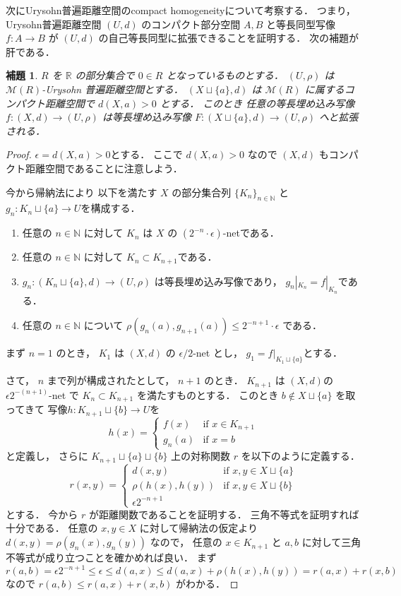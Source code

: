 \documentclass[leqno, 12pt]{jsarticle}
\newtheorem{lem}[thm]{補題}
\newcommand{\nn}{\mathbb{N}}
\newcommand{\rr}{\mathbb{R}}
\begin{document}
次にUrysohn普遍距離空間のcompact homogeneityについて考察する．
つまり，Urysohn普遍距離空間
$(U, d)$
のコンパクト部分空間
$A, B$
と等長同型写像
$f\colon  A\to B$
が
$(U, d)$
の自己等長同型に拡張できることを証明する．
次の補題が肝である．
\begin{lem}\label{lem:pp:cpthom}
$R$
を
$\rr$
の部分集合で
$0\in R$
となっているものとする．
$(U, \rho)$
は
$\mathscr{M}(R)$-Urysohn
普遍距離空間とする．
$(X\sqcup\{a\}, d)$
は
$\mathscr{M}(R)$
に属するコンパクト距離空間で
$d(X, a)>0$
とする．
このとき
任意の等長埋め込み写像
$f\colon  (X, d)\to(U, \rho)$
は等長埋め込み写像
$F\colon  (X\sqcup \{a\}, d)\to (U, \rho)$
へと拡張される．
\end{lem}
\begin{proof}
$\epsilon =d(X, a)>0$とする．
ここで
$d(X, a)>0$
なので
$(X, d)$
もコンパクト距離空間であることに注意しよう．




今から帰納法により
以下を満たす
$X$
の部分集合列
$\{K_{n}\}_{n\in \nn}$
と
$g_{n}\colon  K_{n}\sqcup\{a\}\to U$を構成する．
\begin{enumerate}
\item 
任意の
$n\in \nn$
に対して
$K_{n}$
は
$X$
の
$(2^{-n}\cdot\epsilon)$-netである．
\item 
任意の
$n\in \nn$
に対して
$K_{n}\subset K_{n+1}$である．
\item 
$g_{n}\colon  (K_{n}\sqcup\{a\}, d)\to (U, \rho)$
は等長埋め込み写像であり，
$g_{n}|_{K_n}=f|_{K_{n}}$である．
\item 
任意の
$n\in \nn$
について
$\rho(g_{n}(a), g_{n+1}(a))\le 2^{-n+1}\cdot \epsilon$
である．
\end{enumerate}
まず
$n=1$
のとき，
$K_{1}$
は
$(X, d)$
の
$\epsilon/2$-net
とし，
$g_{1}=f|_{K_{1}\sqcup\{a\}}$とする．

さて，
$n$
まで列が構成されたとして，
$n+1$
のとき．
$K_{n+1}$
は
$(X, d)$の
$\epsilon 2^{-(n+1)}$-net
で
$K_{n}\subset K_{n+1}$
を満たすものとする．
このとき
$b\not\in X\sqcup\{a\}$
を取ってきて
写像$h\colon  K_{n+1}\sqcup\{b\}\to U$を
\[
h(x)=
\begin{cases}
f(x) & \text{if $x\in K_{n+1}$}\\
g_{n}(a) & \text{if $x=b$}
\end{cases}
\]
と定義し，
さらに
$K_{n+1}\sqcup\{a\}\sqcup\{b\}$
上の対称関数
$r$
を以下のように定義する．
\[
r(x, y)=
\begin{cases}
	d(x, y) & \text{if $x, y\in X\sqcup\{a\}$}\\
	\rho(h(x), h(y)) & \text{if $x, y\in X\sqcup\{b\}$}\\
	\epsilon 2^{-n+1}
\end{cases}
\]
とする．
今から
$r$
が距離関数であることを証明する．
三角不等式を証明すれば十分である．
任意の
$x, y\in X$
に対して帰納法の仮定より
$d(x, y)=\rho(g_{n}(x), g_{n}(y))$
なので，
任意の
$x\in K_{n+1}$
と
$a, b$
に対して三角不等式が成り立つことを確かめれば良い．
まず
\[
r(a, b)=\epsilon 2^{-n+1}\le \epsilon  \le d(a, x)\le d(a, x)+\rho(h(x), h(y))
=r(a, x)+r(x, b)
\]
なので
$r(a, b)\le r(a, x)+r(x, b)$
がわかる．





\end{proof}
\end{document}
